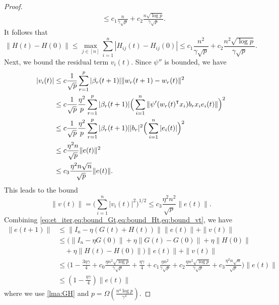\begin{proof}
\begin{equation*}
\begin{aligned}
    &\leq c_1 \frac{n}{\gamma\sqrt p} + c_2\frac{n\sqrt{\log p}}{\gamma\sqrt p}.
\end{aligned}
\end{equation*}
It follows that
\begin{equation}\label{eq:bound_Ht}
    \|H(t)-H(0)\| \leq \max_{j \in [n]}\sum_{i=1}^n|H_{ij}(t) - H_{ij}(0)| \leq c_1 \frac{n^2}{\gamma\sqrt p} + c_2\frac{n^2\sqrt{\log p}}{\gamma\sqrt p}.
\end{equation}
Next, we bound the residual term $v_i(t)$. Since $\psi''$ is bounded, we have
\begin{equation*}
\begin{aligned}
    |v_i(t)|
    &\leq c\frac{1}{\sqrt p}\sum_{r=1}^p|\beta_r(t+1)|\|w_r(t+1)-w_r(t)\|^2 \\
    &\leq c\frac{1}{\sqrt p}\frac{\eta^2}{p}\sum_{r=1}^p|\beta_r(t+1)|\Big(\sum_{i=1}^n\|\psi'(w_r(t)\transpose x_i)b_rx_ie_i(t)\|\Big)^2 \\
    &\leq c\frac{1}{\sqrt p}\frac{\eta^2}{p}\sum_{r=1}^p|\beta_r(t+1)||b_r|^2\Big(\sum_{i=1}^n|e_i(t)|\Big)^2 \\
    &\leq c\frac{\eta^2n}{\sqrt p}\|e(t)\|^2 \\
    &\leq c_3\frac{\eta^2n\sqrt n}{\sqrt p}\|e(t)\|.
\end{aligned}
\end{equation*}
This leads to the bound
\begin{equation}\label{eq:bound_vt}
    \|v(t)\| =\Big(\sum_{i=1}^n|v_i(t)|^2\Big)^{1/2} \leq c_3\frac{\eta^2n^2}{\sqrt p}\|e(t)\|.
\end{equation}
Combining \cref{eq:et_iter,eq:bound_Gt,eq:bound_Ht,eq:bound_vt}, we have
\begin{equation*}
\begin{aligned}
\|e(t+1)\|
&\leq \|I_n-\eta (G(t)+H(t))\|\|e(t)\|+\|v(t)\| \\
&\leq \Big(\|I_n-\eta G(0)\|+\eta\|G(t)-G(0)\|+\eta\|H(0)\| \\
&\quad +\eta\|H(t)-H(0)\|\Big)\|e(t)\| + \|v(t)\| \\
&\leq \Big( 1-\frac{3\eta\gamma}{4}+c_0\frac{\eta n^2\sqrt{\log p}}{\gamma\sqrt p}+\frac{\eta\gamma}{4}+c_1\frac{\eta n^2}{\gamma\sqrt p} + c_2\frac{\eta n^2\sqrt{\log p}}{\gamma\sqrt p}+c_3\frac{\eta^2n\sqrt n}{\sqrt p}\Big)\|e(t)\|  \\
&\leq(1-\frac{\eta\gamma}{4})\|e(t)\|
\end{aligned}
\end{equation*}
where we use \cref{lma:GH} and $p=\Omega(\frac{n^4\log p}{\gamma^4})$.
\end{proof}

